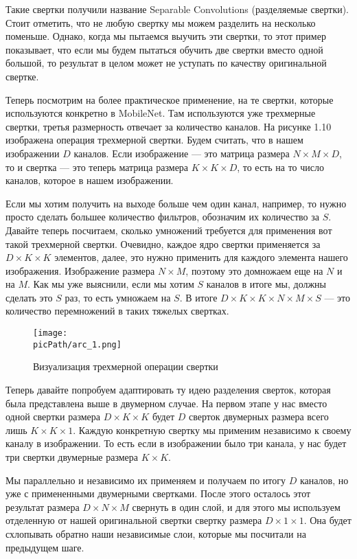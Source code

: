 \documentclass[oneside,final,12pt]{extreport}
\newcommand{\picPath}{images}
\begin{document}
Такие свертки получили название Separable Convolutions (разделяемые свертки). Стоит отметить, что не любую свертку мы можем разделить на несколько поменьше. Однако, когда мы пытаемся выучить эти свертки, то этот пример показывает, что если мы будем пытаться обучить две свертки вместо одной большой, то результат в целом может не уступать по качеству оригинальной свертке.

Теперь посмотрим на более практическое применение, на те свертки, которые используются конкретно в MobileNet. Там используются уже трехмерные свертки, третья размерность отвечает за количество каналов. На рисунке 1.10 изображена операция трехмерной свертки. Будем считать, что в нашем изображении $D$ каналов. Если изображение — это матрица размера $N \times M \times D$, то и свертка — это теперь матрица размера $K \times K \times D$, то есть на то число каналов, которое в нашем изображении. 

Если мы хотим получить на выходе больше чем один канал, например, то нужно просто сделать большее количество фильтров, обозначим их количество за $S$. Давайте теперь посчитаем, сколько умножений требуется для применения вот такой трехмерной свертки. Очевидно, каждое ядро свертки применяется за $D \times K \times K$ элементов, далее, это нужно применить для каждого элемента нашего изображения. Изображение размера $N \times M$, поэтому это домножаем еще на $N$ и на $M$. Как мы уже выяснили, если мы хотим $S$ каналов в итоге мы, должны сделать это $S$ раз, то есть умножаем на $S$. В итоге $D \times K \times K \times N \times M \times S$ — это количество перемножений в таких тяжелых свертках.

\begin{figure}[H]
\begin{center}
  \texttt{[image: \\picPath/arc\_1.png]}
  \caption{Визуализация трехмерной операции свертки}
  \label{fig:arc_1}
  \end{center}
\end{figure}

Теперь давайте попробуем адаптировать ту идею разделения сверток, которая была представлена выше в двумерном случае. На первом этапе у нас вместо одной свертки размера $D \times K \times K$ будет $D$ сверток двумерных размера всего лишь $K \times K \times 1$. Каждую конкретную свертку мы применим независимо к своему каналу в изображении. То есть если в изображении было три канала, у нас будет три свертки двумерные размера $K \times K$. 

Мы параллельно и независимо их применяем и получаем по итогу $D$ каналов, но уже с примененными двумерными свертками. После этого осталось этот результат размера $D \times N \times M$ свернуть в один слой, и для этого мы используем отделенную от нашей оригинальной свертки свертку размера $D \times 1 \times 1$. Она будет схлопывать обратно наши независимые слои, которые мы посчитали на предыдущем шаге. 
\end{document}
